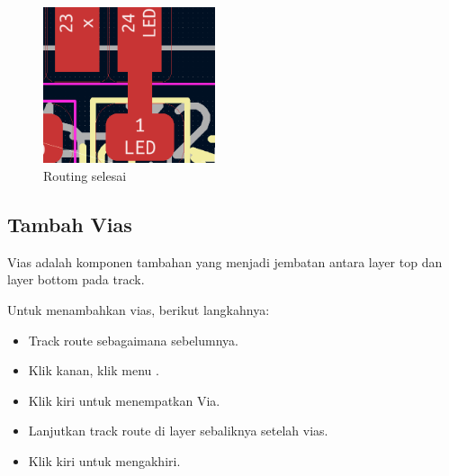 \documentclass[12pt]{book}
\begin{document}
	\begin{figure}[!ht]
		\centering
		\includegraphics[width=0.45\textwidth]{images/pcb/pcb_14}
		\caption{Routing selesai}
	\end{figure}

	\newpage
	\subsection{Tambah Vias}

	Vias adalah komponen tambahan yang menjadi jembatan antara layer top dan layer bottom
	pada track.

	Untuk menambahkan vias, berikut langkahnya:
	\begin{itemize}
		\item Track route sebagaimana sebelumnya.
		\item Klik kanan, klik menu .
		\item Klik kiri untuk menempatkan Via.
		\item Lanjutkan track route di layer sebaliknya setelah vias.
		\item Klik kiri untuk mengakhiri.
	\end{itemize}
\end{document}
